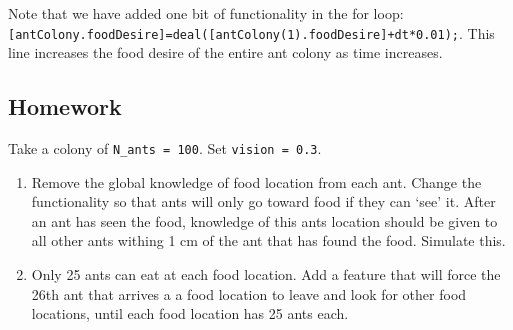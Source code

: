 \documentclass[12pt]{article}
\begin{document}
Note that we have added one bit of functionality in the for loop: \lstinline|[antColony.foodDesire]=deal([antColony(1).foodDesire]+dt*0.01);|. This line increases the food desire of the entire ant colony as time increases. 

\subsection{Homework}
Take a colony of \lstinline|N_ants = 100|. Set \lstinline|vision = 0.3|.
\begin{enumerate}
\item Remove the global knowledge of food location from each ant. Change the functionality so that ants will only go toward food if they can `see' it. After an ant has seen the food, knowledge of this ants location should be given to all other ants withing 1 cm of the ant that has found the food. Simulate this. 
\item Only 25 ants can eat at each food location. Add a feature that will force the 26th ant that arrives a a food location to leave and look for other food locations, until each food location has 25 ants each. 
\end{enumerate} 

\printbibliography
\end{document}

